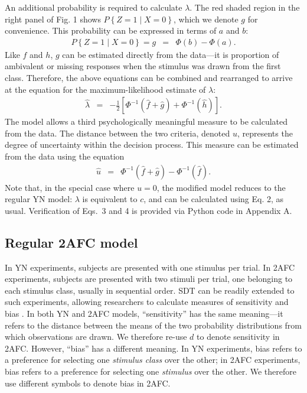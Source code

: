 \documentclass[man]{apa6}
\begin{document}
An additional probability is required to calculate $\lambda$. The red shaded region in the right panel of Fig. 1 shows $P\left\{Z=1\mid{}X=0\right\}$, which we denote $g$ for convenience. This probability can be expressed in terms of $a$ and $b$:
\begin{eqnarray*}
P\left\{Z=1\mid{}X=0\right\}=g&=&\Phi\left(b\right)-\Phi\left(a\right)\textrm{.}
\end{eqnarray*}
Like $f$ and $h$, $g$ can be estimated directly from the data---it is proportion of ambivalent or missing responses when the stimulus was drawn from the first class. Therefore, the above equations can be combined and rearranged to arrive at the equation for the maximum-likelihood estimate of $\lambda$:
\begin{eqnarray}
\hat{\lambda}&=&-\frac{1}{2}\left[\Phi^{-1}\left(\hat{f}+\hat{g}\right)+\Phi^{-1}\left(\hat{h}\right)\right]\textrm{.}
\end{eqnarray}The model allows a third psychologically meaningful measure to be calculated from the data. The distance between the two criteria, denoted $u$, represents the degree of uncertainty within the decision process. This measure can be estimated from the data using the equation
\begin{eqnarray}
\hat{u}&=&\Phi^{-1}\left(\hat{f}+\hat{g}\right)-\Phi^{-1}\left(\hat{f}\right)\textrm{.}
\end{eqnarray}Note that, in the special case where $u=0$, the modified model reduces to the regular YN model: $\lambda$ is equivalent to $c$, and can be calculated using Eq. 2, as usual. Verification of Eqs.~3 and 4 is provided via Python code in Appendix A.

\subsection{Regular 2AFC model}
In YN experiments, subjects are presented with one stimulus per trial. In 2AFC experiments, subjects are presented with two stimuli per trial, one belonging to each stimulus class, usually in sequential order. SDT can be readily extended to such experiments, allowing researchers to calculate measures of sensitivity and bias  \parencite[e.g.,][]{decarloon2012}. In both YN and 2AFC models, ``sensitivity'' has the same meaning---it refers to the distance between the means of the two probability distributions from which observations are drawn. We therefore re-use $d$ to denote sensitivity in 2AFC. However, ``bias'' has a different meaning. In YN experiments, bias refers to a preference for selecting one \emph{stimulus class} over the other; in 2AFC experiments, bias refers to a preference for selecting one \emph{stimulus} over the other. We therefore use different symbols to denote bias in 2AFC.
\end{document}
